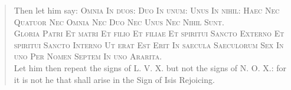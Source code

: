 \begin{verse}
Then let him say: \textsc{Omnia In duos: Duo In unum: Unus In nihil: Haec Nec Quatuor Nec Omnia Nec Duo Nec Unus Nec Nihil Sunt.}\\
\textsc{Gloria Patri Et matri Et filio Et filiae Et spiritui Sancto Externo Et spiritui Sancto Interno Ut erat Est Erit In saecula Saeculorum Sex In uno Per Nomen Septem In uno Ararita.}\\
Let him then repeat the signs of L.\nolinebreak{} V.\nolinebreak{} X.\nolinebreak{} but not the signs of N.\nolinebreak{} O.\nolinebreak{} X.\nolinebreak{}: for it is not he that shall arise in the Sign of Isis Rejoicing.
\end{verse}
